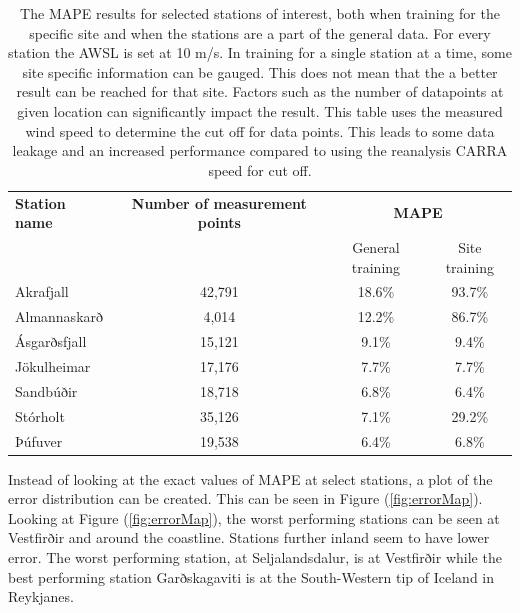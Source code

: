 \begin{table}[h]
    \caption[Model result by station]{The MAPE results for selected stations of interest, both when training for the specific site and when the stations are a part of the general data. For every station the AWSL is set at 10 m/s. In training for a single station at a time, some site specific information can be gauged. This does not mean that the a better result can be reached for that site. Factors such as the number of datapoints at given location can significantly impact the result. This table uses the measured wind speed to determine the cut off for data points. This leads to some data leakage and an increased performance compared to using the reanalysis CARRA speed for cut off.}
    \label{table:specific_sites}
    \centering
    \begin{tabular}{lccc}
        \toprule
        \textbf{Station name} & \textbf{Number of measurement points} & \multicolumn{2}{c}{\textbf{MAPE}}\\
        & & General training & Site training\\
        \midrule
        Akrafjall & 42,791 & 18.6\% & 93.7\%\\
        Almannaskarð & 4,014 & 12.2\% & 86.7\%\\
        Ásgarðsfjall & 15,121 & 9.1\% & 9.4\%\\
        Jökulheimar & 17,176 & 7.7\% & 7.7\%\\
        Sandbúðir & 18,718 & 6.8\% & 6.4\%\\
        Stórholt & 35,126 & 7.1\% & 29.2\% \\
        Þúfuver & 19,538 & 6.4\% & 6.8\%\\
        \bottomrule
    \end{tabular}
\end{table}

Instead of looking at the exact values of MAPE at select stations, a plot of the error distribution can be created. This can be seen in Figure (\ref{fig:errorMap}). Looking at Figure (\ref{fig:errorMap}), the worst performing stations can be seen at Vestfirðir and around the coastline. Stations further inland seem to have lower error. The worst performing station, at Seljalandsdalur, is at Vestfirðir while the best performing station Garðskagaviti is at the South-Western tip of Iceland in Reykjanes.

